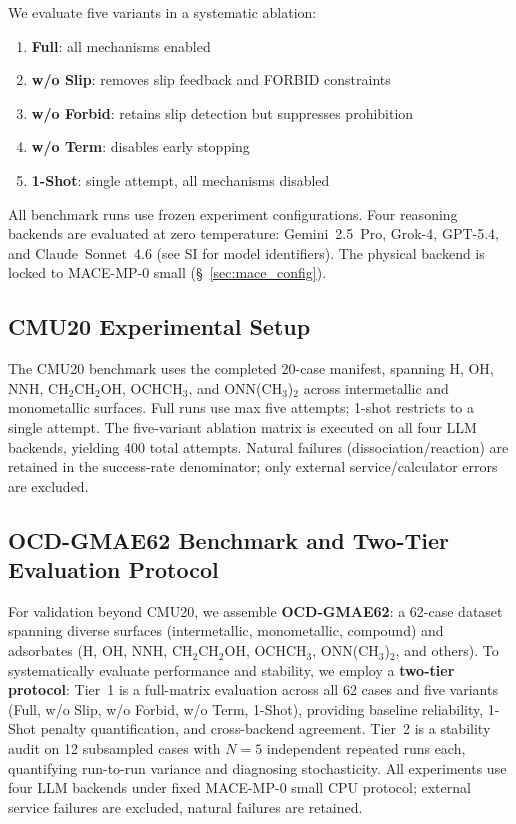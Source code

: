 We evaluate five variants in a systematic ablation:
\begin{enumerate}
  \item \textbf{Full}: all mechanisms enabled
  \item \textbf{w/o Slip}: removes slip feedback and FORBID constraints
  \item \textbf{w/o Forbid}: retains slip detection but suppresses prohibition
  \item \textbf{w/o Term}: disables early stopping
  \item \textbf{1-Shot}: single attempt, all mechanisms disabled
\end{enumerate}

All benchmark runs use frozen experiment configurations. Four reasoning backends are evaluated at zero temperature: Gemini~2.5~Pro, Grok-4, GPT-5.4, and Claude~Sonnet~4.6 (see SI for model identifiers).
The physical backend is locked to MACE-MP-0 small (\S~\ref{sec:mace_config}).

\subsection{CMU20 Experimental Setup}

The CMU20 benchmark uses the completed 20-case manifest, spanning H, OH, NNH, CH$_2$CH$_2$OH, OCHCH$_3$, and ONN(CH$_3$)$_2$ across intermetallic and monometallic surfaces.
Full runs use max five attempts; 1-shot restricts to a single attempt.
The five-variant ablation matrix is executed on all four LLM backends, yielding 400 total attempts.
Natural failures (dissociation/reaction) are retained in the success-rate denominator; only external service/calculator errors are excluded.

\subsection{OCD-GMAE62 Benchmark and Two-Tier Evaluation Protocol}

For validation beyond CMU20, we assemble \textbf{OCD-GMAE62}: a 62-case dataset spanning diverse surfaces (intermetallic, monometallic, compound) and adsorbates (H, OH, NNH, CH$_2$CH$_2$OH, OCHCH$_3$, ONN(CH$_3$)$_2$, and others).
To systematically evaluate performance and stability, we employ a \textbf{two-tier protocol}:
Tier~1 is a full-matrix evaluation across all 62 cases and five variants (Full, w/o Slip, w/o Forbid, w/o Term, 1-Shot), providing baseline reliability, 1-Shot penalty quantification, and cross-backend agreement.
Tier~2 is a stability audit on 12 subsampled cases with $N=5$ independent repeated runs each, quantifying run-to-run variance and diagnosing stochasticity.
All experiments use four LLM backends under fixed MACE-MP-0 small CPU protocol; external service failures are excluded, natural failures are retained.

